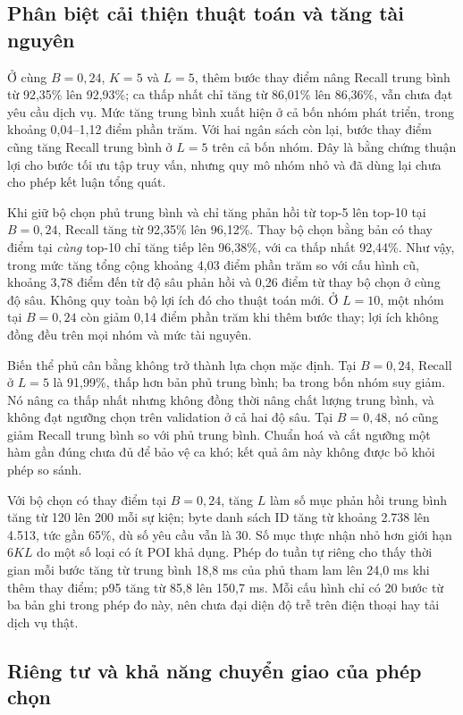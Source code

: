 \subsection{Phân biệt cải thiện thuật toán và tăng tài nguyên}

Ở cùng $B=0{,}24$, $K=5$ và $L=5$, thêm bước thay điểm nâng Recall trung bình từ 92,35\% lên 92,93\%; ca thấp nhất chỉ tăng từ 86,01\% lên 86,36\%, vẫn chưa đạt yêu cầu dịch vụ. Mức tăng trung bình xuất hiện ở cả bốn nhóm phát triển, trong khoảng 0,04--1,12 điểm phần trăm. Với hai ngân sách còn lại, bước thay điểm cũng tăng Recall trung bình ở $L=5$ trên cả bốn nhóm. Đây là bằng chứng thuận lợi cho bước tối ưu tập truy vấn, nhưng quy mô nhóm nhỏ và đã dùng lại chưa cho phép kết luận tổng quát.

Khi giữ bộ chọn phủ trung bình và chỉ tăng phản hồi từ top-5 lên top-10 tại $B=0{,}24$, Recall tăng từ 92,35\% lên 96,12\%. Thay bộ chọn bằng bản có thay điểm tại \emph{cùng} top-10 chỉ tăng tiếp lên 96,38\%, với ca thấp nhất 92,44\%. Như vậy, trong mức tăng tổng cộng khoảng 4,03 điểm phần trăm so với cấu hình cũ, khoảng 3,78 điểm đến từ độ sâu phản hồi và 0,26 điểm từ thay bộ chọn ở cùng độ sâu. Không quy toàn bộ lợi ích đó cho thuật toán mới. Ở $L=10$, một nhóm tại $B=0{,}24$ còn giảm 0,14 điểm phần trăm khi thêm bước thay; lợi ích không đồng đều trên mọi nhóm và mức tài nguyên.

Biến thể phủ cân bằng không trở thành lựa chọn mặc định. Tại $B=0{,}24$, Recall ở $L=5$ là 91,99\%, thấp hơn bản phủ trung bình; ba trong bốn nhóm suy giảm. Nó nâng ca thấp nhất nhưng không đồng thời nâng chất lượng trung bình, và không đạt ngưỡng chọn trên validation ở cả hai độ sâu. Tại $B=0{,}48$, nó cũng giảm Recall trung bình so với phủ trung bình. Chuẩn hoá và cắt ngưỡng một hàm gần đúng chưa đủ để bảo vệ ca khó; kết quả âm này không được bỏ khỏi phép so sánh.

Với bộ chọn có thay điểm tại $B=0{,}24$, tăng $L$ làm số mục phản hồi trung bình tăng từ 120 lên 200 mỗi sự kiện; byte danh sách ID tăng từ khoảng 2.738 lên 4.513, tức gần 65\%, dù số yêu cầu vẫn là 30. Số mục thực nhận nhỏ hơn giới hạn $6KL$ do một số loại có ít POI khả dụng. Phép đo tuần tự riêng cho thấy thời gian mỗi bước tăng từ trung bình 18,8 ms của phủ tham lam lên 24,0 ms khi thêm thay điểm; p95 tăng từ 85,8 lên 150,7 ms. Mỗi cấu hình chỉ có 20 bước từ ba bản ghi trong phép đo này, nên chưa đại diện độ trễ trên điện thoại hay tải dịch vụ thật.

\subsection{Riêng tư và khả năng chuyển giao của phép chọn}

